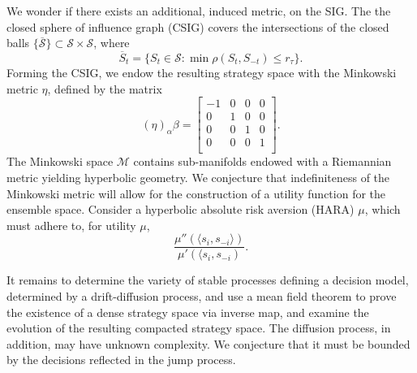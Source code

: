 \documentclass[11pt]{article}
\theoremstyle{definition}
\newcommand{\mcM}{\mathcal{M}}
\newcommand{\mcS}{\mathcal{S}}
\begin{document}
We wonder if there exists an additional, induced metric, on the
SIG. The the closed sphere of influence graph (CSIG) covers the intersections
of the closed balls $\lbrace\overline{\mcS}\rbrace \subset \mcS\times \mcS$, where
$$
    \overline{S}_t= \lbrace S_t \in \mcS : \min\rho(S_t, S_{-t}) \le r_\tau \rbrace.
$$
Forming the CSIG,
we endow the resulting strategy space with the Minkowski metric $\eta$, defined by the matrix
$$
	(\eta)_\alpha\beta = \begin{bmatrix}
		-1 & 0 & 0 & 0 \\
		0 & 1 & 0 & 0 \\
		0 & 0 & 1 & 0 \\
		0 & 0 & 0 & 1 \\
	\end{bmatrix}.
$$
The Minkowski space $\mcM$ contains sub-manifolds endowed with a Riemannian metric yielding hyperbolic geometry. 
We conjecture that indefiniteness of the Minkowski metric will allow for the
construction of a utility function for the ensemble space. 
Consider a hyperbolic absolute risk aversion (HARA) $\mu$, which must adhere to,
for utility $\mu$,
$$
    \displaystyle\frac{\mu''(\langle s_i,s_{-i}\rangle)}{\mu'(\langle s_i,
    s_{-i})}.
$$


It remains to determine the variety of stable processes defining a decision model, determined by a drift-diffusion process, and use a mean field theorem to prove the existence of a dense strategy
space via inverse map, and examine the evolution of the resulting compacted strategy space. 
The diffusion process, in addition, may have unknown complexity. We conjecture that it must be bounded by the decisions reflected in the jump process.



	
		
\end{document}
